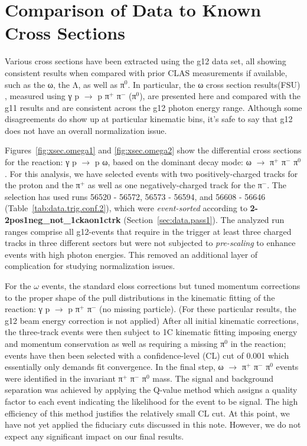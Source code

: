 \section{\label{sec:xsec}Comparison of Data to Known Cross Sections}

Various cross sections have been extracted using the g12 data set, all showing consistent results when compared with prior CLAS measurements if available, such as the ω, the Λ, as well as π$^0$. In particular, the ω cross section results(FSU) , measured using γ p $\rightarrow$ p π$^+$ π$^-$ (π$^0$), are presented here and compared with the g11 results and are consistent across the g12 photon energy range. Although some disagreements do show up at particular kinematic bins, it's safe to say that g12 does not have an overall normalization issue.

Figures~\ref{fig:xsec.omega1} and \ref{fig:xsec.omega2} show the differential cross sections for the reaction: γ p $\rightarrow$ p ω, based on the dominant decay mode: ω $\rightarrow$ π$^+$ π$^-$ π$^0$. For this analysis, we have selected events with two positively-charged tracks for the proton and the π$^+$ as well as one negatively-charged track for the π$^-$. The selection has used runs 56520 - 56572, 56573 - 56594, and 56608 - 56646 (Table~\ref{tab:data.trig.conf.2}), which were {\it event-sorted} according to {\bf 2-2pos1neg\_not\_1ckaon1ctrk} (Section~\ref{sec:data.pass1}). The analyzed run ranges comprise all g12-events that require in the trigger at least three charged tracks in three different sectors but were not subjected to {\it pre-scaling} to enhance events with high photon energies. This removed an additional layer of complication for studying normalization issues.

For the $\omega$ events, the standard {\sc eloss} corrections but tuned momentum corrections to the proper shape of the pull distributions in the kinematic fitting of the reaction: γ p $\rightarrow$ p π$^+$ π$^-$ (no missing particle). (For these particular results, the g12 beam energy correction is not applied) After all initial kinematic corrections, the three-track events were then subject to 1C kinematic fitting imposing energy and momentum conservation as well as requiring a missing π$^0$ in the reaction; events have then been selected with a confidence-level (CL) cut of 0.001 which essentially only demands fit convergence. In the final step, ω $\rightarrow$ π$^+$ π$^-$ π$^0$ events were identified in the invariant π$^+$ π$^-$ π$^0$ mass. The signal and background separation was achieved by applying the Q-value method which assigns a quality factor to each event indicating the likelihood for the event to be signal. The high efficiency of this method justifies the relatively small CL cut. At this point, we have not yet applied the fiduciary cuts discussed in this note. However, we do not expect any significant impact on our final results.

